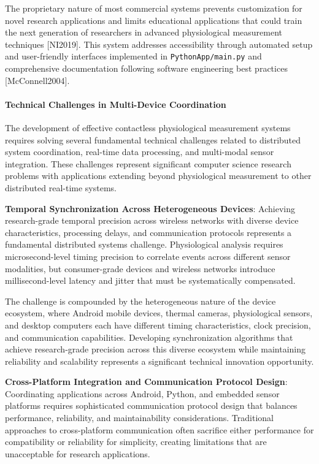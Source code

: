 \documentclass[12pt,a4paper]{article}
\begin{document}
The proprietary nature of most commercial systems prevents customization for novel research applications and limits
educational applications that could train the next generation of researchers in advanced physiological measurement
techniques [NI2019]. This system addresses accessibility through automated setup and user-friendly interfaces
implemented in \texttt{PythonApp/main.py} and comprehensive documentation following software engineering best
practices [McConnell2004].

\paragraph{Technical Challenges in Multi-Device Coordination}

The development of effective contactless physiological measurement systems requires solving several fundamental
technical challenges related to distributed system coordination, real-time data processing, and multi-modal sensor
integration. These challenges represent significant computer science research problems with applications extending
beyond physiological measurement to other distributed real-time systems.

\textbf{Temporal Synchronization Across Heterogeneous Devices}: Achieving research-grade temporal precision across wireless
networks with diverse device characteristics, processing delays, and communication protocols represents a fundamental
distributed systems challenge. Physiological analysis requires microsecond-level timing precision to correlate events
across different sensor modalities, but consumer-grade devices and wireless networks introduce millisecond-level latency
and jitter that must be systematically compensated.

The challenge is compounded by the heterogeneous nature of the device ecosystem, where Android mobile devices, thermal
cameras, physiological sensors, and desktop computers each have different timing characteristics, clock precision, and
communication capabilities. Developing synchronization algorithms that achieve research-grade precision across this
diverse ecosystem while maintaining reliability and scalability represents a significant technical innovation
opportunity.

\textbf{Cross-Platform Integration and Communication Protocol Design}: Coordinating applications across Android, Python, and
embedded sensor platforms requires sophisticated communication protocol design that balances performance, reliability,
and maintainability considerations. Traditional approaches to cross-platform communication often sacrifice either
performance for compatibility or reliability for simplicity, creating limitations that are unacceptable for research
applications.
\end{document}

